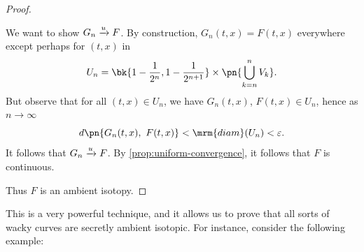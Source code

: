 \begin{proof}
\begin{enumerate}
      We want to show $G_n \xrightarrow{u} F$. By construction, $G_n(t,x) =
      F(t,x)$ everywhere except perhaps for $(t,x)$ in
      \[
      U_n = \bk{1 - \frac{1}{2^n}, 1 - \frac{1}{2^{n+1}}} \times
      \pn{\bigcup_{k=n}^n V_k}.
      \]
      But observe that for all $(t,x) \in U_n$, we have $G_n(t,x)$,
      $F(t,x) \in U_n$, hence as $n \to \infty$
      \[
      d\pn{G_n(t,x),\ F(t,x)} < \mrm{diam}(U_n) < \varepsilon.
      \]
      It follows that $G_n \xrightarrow{u} F$. By
      \cref{prop:uniform-convergence}, it follows that $F$ is
      continuous.
  \end{enumerate}
  Thus $F$ is an ambient isotopy.
\end{proof}
This is a very powerful technique, and it allows us to prove that all
sorts of wacky curves are secretly ambient isotopic. For instance,
consider the following example:
